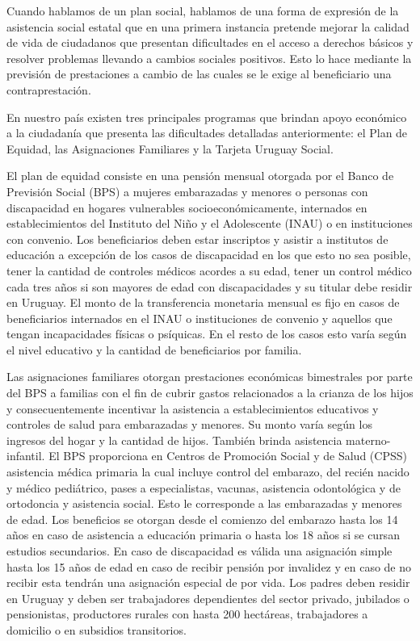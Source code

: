 \documentclass{article}
\begin{document}
Cuando hablamos de un plan social, hablamos de una forma de expresión de la asistencia social estatal que en una primera instancia pretende mejorar la calidad de vida de ciudadanos que presentan dificultades en el acceso a derechos básicos y resolver problemas llevando a cambios sociales positivos. Esto lo hace mediante la previsión de prestaciones a cambio de las cuales se le exige al beneficiario una contraprestación.

En nuestro país existen tres principales programas que brindan apoyo económico a la ciudadanía que presenta las dificultades detalladas anteriormente: el Plan de Equidad, las Asignaciones Familiares y la Tarjeta Uruguay Social.

El plan de equidad consiste en una pensión mensual otorgada por el  Banco de Previsión Social (BPS) a mujeres embarazadas y menores o personas con discapacidad en hogares vulnerables socioeconómicamente, internados en establecimientos del Instituto del Niño y el Adolescente (INAU) o en instituciones con convenio. Los beneficiarios deben estar inscriptos y asistir a institutos de educación a excepción de los casos de discapacidad en los que esto no sea posible, tener la cantidad de controles médicos acordes a su edad, tener un control médico cada tres años si son mayores de edad con discapacidades y su titular debe residir en Uruguay. El monto de la transferencia monetaria mensual es fijo en casos de beneficiarios internados en el INAU o instituciones de convenio y aquellos que tengan incapacidades físicas o psíquicas. En el resto de los casos esto varía según el nivel educativo y la cantidad de beneficiarios por familia.

Las asignaciones familiares otorgan prestaciones económicas bimestrales por parte del BPS a familias con el fin de cubrir gastos relacionados a la crianza de los hijos y consecuentemente incentivar la asistencia a establecimientos educativos y controles de salud para embarazadas y menores. Su monto varía según los ingresos del hogar y la cantidad de hijos. También brinda asistencia materno-infantil. El BPS proporciona en Centros de Promoción Social y de Salud (CPSS) asistencia médica primaria la cual incluye control del embarazo, del recién nacido y médico pediátrico, pases a especialistas, vacunas, asistencia odontológica y de ortodoncia y asistencia social. Esto le corresponde a las embarazadas y menores de edad.  Los beneficios se otorgan desde el comienzo del embarazo hasta los 14 años en caso de asistencia a educación primaria o hasta los 18 años si se cursan estudios secundarios. En caso de discapacidad es válida una asignación simple hasta los 15 años de edad en caso de recibir pensión por invalidez y en caso de no recibir esta tendrán una asignación especial de por vida. Los padres deben residir en Uruguay y deben ser trabajadores dependientes del sector privado, jubilados o pensionistas, productores rurales con hasta 200 hectáreas, trabajadores a domicilio o en subsidios transitorios.
\end{document}
